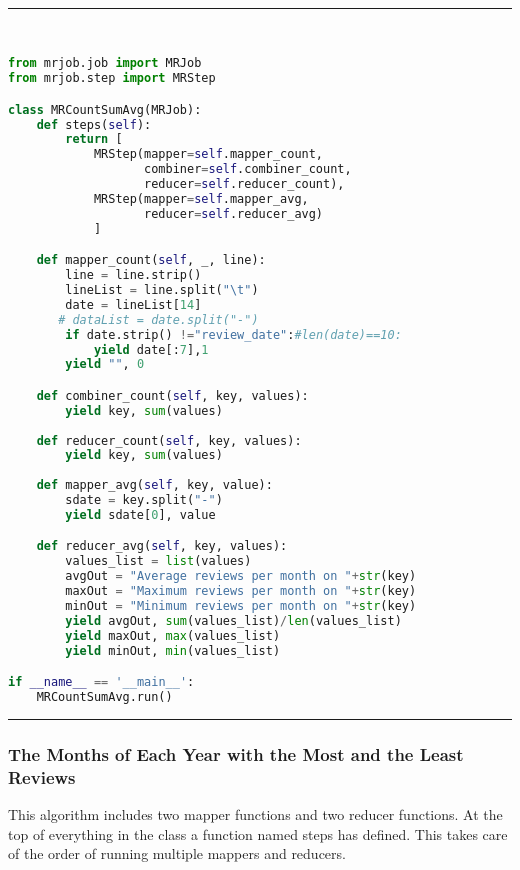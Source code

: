 \rule{200 pt}{0.5 pt} 

\renewcommand{\lstlistingname}{Code}
\lstset{style=mystyle}
\begin{lstlisting}[language=Python, caption={Average Number of Reviews per Month During Each Year}, label={lst:avgRev}, mathescape = true, breaklines=true]


from mrjob.job import MRJob
from mrjob.step import MRStep

class MRCountSumAvg(MRJob):
    def steps(self):
        return [
            MRStep(mapper=self.mapper_count,
                   combiner=self.combiner_count,
                   reducer=self.reducer_count),
            MRStep(mapper=self.mapper_avg,
                   reducer=self.reducer_avg)
            ]

    def mapper_count(self, _, line):
        line = line.strip()  
        lineList = line.split("\t")
        date = lineList[14]
       # dataList = date.split("-")
        if date.strip() !="review_date":#len(date)==10:
            yield date[:7],1
        yield "", 0

    def combiner_count(self, key, values):
        yield key, sum(values)
        
    def reducer_count(self, key, values):
        yield key, sum(values)
        
    def mapper_avg(self, key, value):
        sdate = key.split("-")
        yield sdate[0], value

    def reducer_avg(self, key, values):
        values_list = list(values)
        avgOut = "Average reviews per month on "+str(key)
        maxOut = "Maximum reviews per month on "+str(key)
        minOut = "Minimum reviews per month on "+str(key)
        yield avgOut, sum(values_list)/len(values_list)
        yield maxOut, max(values_list)
        yield minOut, min(values_list)

if __name__ == '__main__':
    MRCountSumAvg.run()
\end{lstlisting}

\rule{200 pt}{0.5 pt} 

\subsubsection{The Months of Each Year with the Most and the Least Reviews}
This algorithm includes two mapper functions and two reducer functions. At the top of everything in the class    a function named steps has defined. This takes care of the order of running multiple mappers and reducers.


